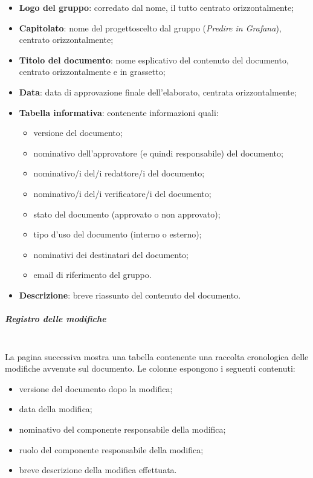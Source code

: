                 \begin{itemize}
                    \item \textbf{Logo del gruppo}: corredato dal nome, il tutto centrato orizzontalmente;
                    \item \textbf{Capitolato}\glo: nome del progetto\glosp scelto dal gruppo (\textit{Predire in Grafana}), centrato orizzontalmente;
                    \item \textbf{Titolo del documento}: nome esplicativo del contenuto del documento, centrato orizzontalmente e in grassetto;
                    \item \textbf{Data}: data di approvazione finale dell'elaborato, centrata orizzontalmente;
                    \item \textbf{Tabella informativa}: contenente informazioni quali:
                    \begin{itemize}
                        \item versione del documento;
                        \item nominativo dell'approvatore (e quindi responsabile) del documento;
                        \item nominativo/i del/i redattore/i del documento;
                        \item nominativo/i del/i verificatore/i del documento;
                        \item stato del documento (approvato o non approvato);
                        \item tipo d'uso del documento (interno o esterno);
                        \item nominativi dei destinatari del documento;
                        \item email di riferimento del gruppo.
                    \end{itemize} 
                    \item \textbf{Descrizione}: breve riassunto del contenuto del documento.
                \end{itemize}
            \subparagraph{Registro delle modifiche}\mbox{}\\ [1mm]
                La pagina successiva mostra una tabella contenente una raccolta cronologica delle modifiche avvenute sul documento.
                Le colonne espongono i seguenti contenuti:
                \begin{itemize}
                    \item versione del documento dopo la modifica;
                    \item data della modifica;
                    \item nominativo del componente responsabile della modifica;
                    \item ruolo del componente responsabile della modifica;
                    \item breve descrizione della modifica effettuata.
                \end{itemize}
